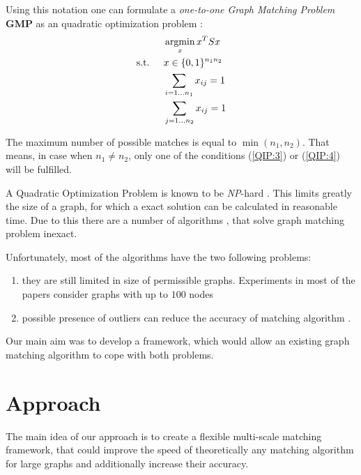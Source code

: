 \documentclass[
	fontsize=12pt,
	paper=a4,
	twoside=false,
	numbers=noenddot,
	plainheadsepline,
	toc=listof,
	toc=bibliography
]{scrartcl}
\def\argmax{\mathop{\rm argmax}}						%
\def\argmax{\mathop{\rm argmin}}						%
\begin{document}
Using this notation one can formulate a \emph{one-to-one Graph Matching Problem} \textbf{GMP} as an quadratic optimization problem \cite{Cho2014_Haystack, Cho2010_RRWM, Cho2012_ProgressiveGM, Conte2004}: 
\begin{alignat}{2}
    &     && \argmax_x{x^TSx}                           \notag\\
    & \text{s.t. } &&  x\in \{0,1\}^{n_1n_2}            \label{QIP:2}\\
    &             &&  \sum_{i=1\dots n_1} x_{ij} = 1    \label{QIP:3}\\
    &             &&  \sum_{j=1\dots n_2} x_{ij} = 1    \label{QIP:4}
 \end{alignat}
 
The maximum number of possible matches is equal to $\min(n_1, n_2)$. That means, in case when $n_1\not = n_2$, only one of the conditions (\ref{QIP:3}) or (\ref{QIP:4}) will be fulfilled.

A Quadratic Optimization Problem is known to be \emph{NP}-hard \cite{Sahni1974}. This limits greatly the size of a graph, for which a exact solution can be calculated in reasonable time. Due to this there are a number of algorithms \cite{Cho2014_Haystack, Cho2010_RRWM, Cho2012_ProgressiveGM, Chui2003, Suh_CVPR2015}, that solve graph matching problem inexact.

Unfortunately, most of the algorithms have the two following problems:
\begin{enumerate}
\item they are still limited in size of permissible graphs. Experiments in most of the papers consider graphs with up to $100$ nodes \cite{Cho2014_Haystack, Cho2010_RRWM, Cho2012_ProgressiveGM}
\item possible presence of outliers can reduce the accuracy of matching algorithm \cite{Suh_CVPR2015}.
\end{enumerate}  

Our main aim was to develop a framework, which would allow an existing graph matching algorithm to cope with both problems.


\section{Approach}

The main idea of our approach is to create a flexible multi-scale matching framework, that could improve the speed of
theoretically any matching algorithm for large graphs and additionally increase their accuracy. 
\end{document}
